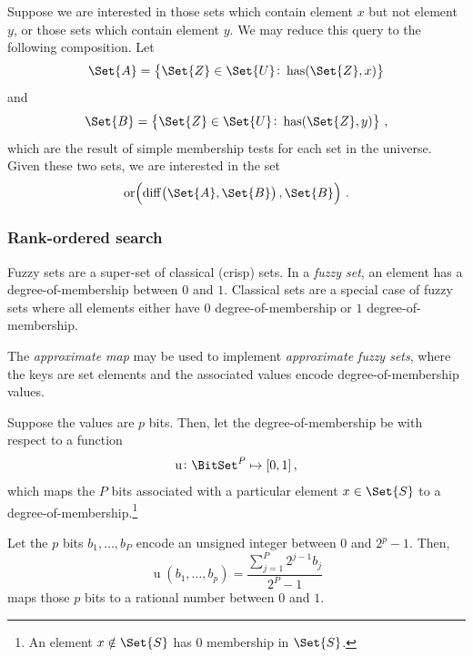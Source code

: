 \documentclass[ ../main.tex]{subfiles}
\begin{document}
\begin{example}
Suppose we are interested in those sets which contain element $x$ but not element $y$, or those sets which contain element $y$. We may reduce this query to the following composition. Let
\begin{equation*}
    \Set{A} = \left\{ \Set{Z} \in \Set{U} \colon \Has(\Set{Z}, x) \right\}
\end{equation*}
and
\begin{equation*}
    \Set{B} = \left\{ \Set{Z} \in \Set{U} \colon \Has(\Set{Z}, y) \right\}\,,
\end{equation*}
which are the result of simple membership tests for each set in the universe. Given these two sets, we are interested in the set
\begin{equation*}
    \orfn\!\left(\diffn\!\left(\Set{A}, \Set{B}\right), \Set{B}\right)\,.
\end{equation*}
\end{example}

\subsubsection{Rank-ordered search}
\label{sec:extensions:fuzzyset}
Fuzzy sets are a super-set of  classical (crisp) sets. In a \emph{fuzzy set}, an element has a degree-of-membership between $0$ and $1$. Classical sets are a special case of fuzzy sets where all elements either have $0$ degree-of-membership or $1$ degree-of-membership.

The \emph{approximate map} may be used to implement \emph{approximate fuzzy sets}, where the keys are set elements and the associated values encode degree-of-membership values.

Suppose the values are $p$ bits. Then, let the degree-of-membership be with respect to a function
\begin{equation}
    \operatorname{u} \colon \BitSet^P \mapsto [0,1]\,,
\end{equation}
which maps the $P$ bits associated with a particular element $x \in \Set{S}$ to a degree-of-membership.\footnote{An element $x \notin \Set{S}$ has $0$ membership in $\Set{S}$.}
\begin{example}
Let the $p$ bits $b_1, \ldots, b_P$ encode an unsigned integer between $0$ and $2^p-1$. Then,
\begin{equation}
    \operatorname{u}\!\left(b_1, \ldots, b_p\right) = \frac{\sum_{j=1}^{P} 2^{j-1} b_j}{2^P-1}
\end{equation}
maps those $p$ bits to a rational number between $0$ and $1$.
\end{example}
\end{document}
